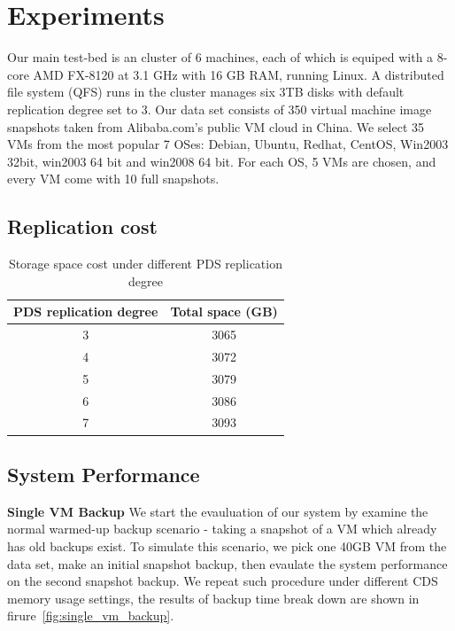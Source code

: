 \section{Experiments}
Our main test-bed is an cluster of 6 machines,
each of which is equiped with a 8-core AMD FX-8120 at 3.1 GHz
with 16 GB RAM, running Linux.
A distributed file system (QFS) runs in the cluster manages six 3TB disks
 with default replication degree set to 3.
Our data set consists of 350 virtual machine image snapshots taken from Alibaba.com's
public VM cloud in China. We select 35 VMs from the most popular 7 OSes: 
Debian, Ubuntu, Redhat, CentOS, Win2003 32bit, win2003 64 bit and win2008 64 bit. 
For each OS, 5 VMs are chosen, and every VM come with 10 full snapshots.

\subsection{Replication cost}
\begin{table}
    \begin{tabular}{|c|c|}
    \hline
    PDS replication degree & Total space (GB) \\ \hline
    3                      & 3065             \\ \hline
    4                      & 3072             \\ \hline
    5                      & 3079             \\ \hline
    6                      & 3086             \\ \hline
    7                      & 3093             \\ \hline
    \end{tabular}
\caption{Storage space cost under different PDS replication degree}
\label{tab:replcation_cost}
\end{table}

\subsection{System Performance}
{\bf Single VM Backup} We start the evauluation of our system by examine the normal warmed-up
backup scenario - taking a snapshot of a VM which already has old backups exist. To simulate this
scenario, we pick one 40GB VM from the data set, make an initial snapshot backup, then
evaulate the system performance on the second snapshot backup. We repeat such procedure
under different CDS memory usage settings, the results of backup time break down are shown in
firure~\ref{fig:single_vm_backup}. 

